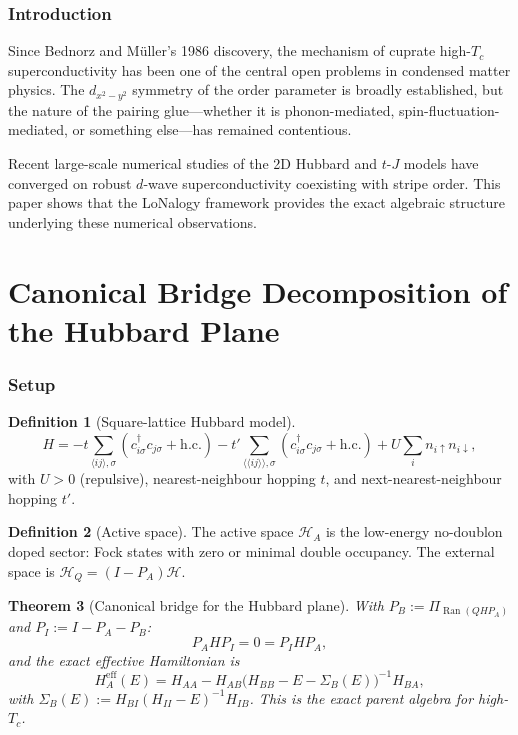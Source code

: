 \documentclass[12pt]{article}
\theoremstyle{plain}
\newtheorem{theorem}{Theorem}[section]
\theoremstyle{definition}
\newtheorem{definition}[theorem]{Definition}
\numberwithin{equation}{section}
\newcommand{\eff}{\mathrm{eff}}
\DeclareMathOperator{\Ran}{Ran}
\begin{document}
\section*{Introduction}

Since Bednorz and M\"uller's 1986 discovery, the mechanism of
cuprate high-$T_c$ superconductivity has been one of the central
open problems in condensed matter physics.  The $d_{x^2-y^2}$
symmetry of the order parameter is broadly established, but the
nature of the pairing glue---whether it is phonon-mediated,
spin-fluctuation-mediated, or something else---has remained
contentious.

Recent large-scale numerical studies of the 2D Hubbard and $t$-$J$
models have converged on robust $d$-wave superconductivity
coexisting with stripe order.  This paper shows that the LoNalogy
framework provides the exact algebraic structure underlying these
numerical observations.


\part{Canonical Bridge Decomposition of the Hubbard Plane}

\section{Setup}\label{sec:setup}

\begin{definition}[Square-lattice Hubbard model]
\begin{equation}\label{eq:hubbard}
H = -t\sum_{\langle ij\rangle,\sigma}
(c_{i\sigma}^\dagger c_{j\sigma}+\mathrm{h.c.})
-t'\sum_{\langle\langle ij\rangle\rangle,\sigma}
(c_{i\sigma}^\dagger c_{j\sigma}+\mathrm{h.c.})
+ U\sum_i n_{i\uparrow}n_{i\downarrow},
\end{equation}
with $U>0$ (repulsive), nearest-neighbour hopping $t$, and
next-nearest-neighbour hopping $t'$.
\end{definition}

\begin{definition}[Active space]\label{def:active}
The active space $\mathcal{H}_A$ is the low-energy no-doublon
doped sector: Fock states with zero or minimal double occupancy.
The external space is $\mathcal{H}_Q=(I-P_A)\mathcal{H}$.
\end{definition}

\begin{theorem}[Canonical bridge for the Hubbard plane]\label{thm:bridge}
With $P_B:=\Pi_{\Ran(QHP_A)}$ and $P_I:=I-P_A-P_B$:
\begin{equation}
P_AHP_I = 0 = P_IHP_A,
\end{equation}
and the exact effective Hamiltonian is
\begin{equation}\label{eq:Heff}
\boxed{H_A^{\eff}(E) = H_{AA}
- H_{AB}\bigl(H_{BB}-E-\Sigma_B(E)\bigr)^{-1}H_{BA},}
\end{equation}
with $\Sigma_B(E):=H_{BI}(H_{II}-E)^{-1}H_{IB}$.
This is the exact parent algebra for high-$T_c$.
\end{theorem}
\end{document}
